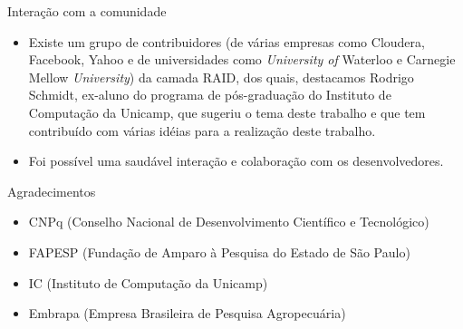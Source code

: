  \begin{frame}{Interação com a comunidade}
   \begin{itemize}
      \item Existe um grupo de contribuidores (de várias empresas como Cloudera, Facebook, Yahoo e de universidades como \emph{University of} Waterloo e Carnegie Mellow \emph{University}) da camada RAID, dos quais, destacamos Rodrigo Schmidt, ex-aluno do programa de pós-graduação do Instituto de Computação da Unicamp, que sugeriu o tema deste trabalho e que tem contribuído com várias idéias para a realização deste trabalho.
      \item Foi possível uma saudável interação e colaboração com os desenvolvedores.
   \end{itemize}
 \end{frame}

\begin{frame}{Agradecimentos}

   \begin{itemize}
        \item CNPq (Conselho Nacional de Desenvolvimento Científico e Tecnológico)
        \item FAPESP (Fundação de Amparo à Pesquisa do Estado de São Paulo)
        \item IC (Instituto de Computação da Unicamp)
        \item Embrapa (Empresa Brasileira de Pesquisa Agropecuária)
  \end{itemize}

\end{frame}
